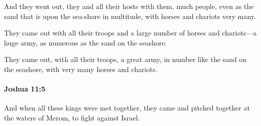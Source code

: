 			\begin{versebox}
					\item[BHS] 
					\item[ASV] And they went out, they and all their hosts with them, much people, even as the sand that is upon the sea-shore in multitude, with horses and chariots very many.
					\item[NIV] They came out with all their troops and a large number of horses and chariots—a huge army, as numerous as the sand on the seashore.
					\item[NRSV] They came out, with all their troops, a great army, in number like the sand on the seashore, with very many horses and chariots.
			\end{versebox}

		\paragraph{Joshua 11:5} %
			\label{JOSHUA-11-5}

			And when all these kings were met together, they came and pitched together at the waters of Merom, to fight against Israel.

